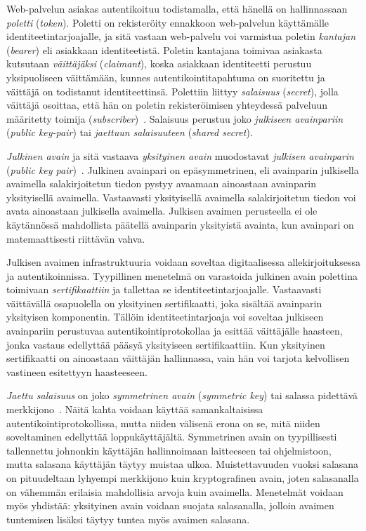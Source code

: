 \documentclass[finnish,gradu]{tktltiki}
\begin{document}
  Web-palvelun asiakas autentikoituu todistamalla, että hänellä on hallinnassaan \emph{poletti} (\emph{token}). Poletti on rekisteröity ennakkoon web-palvelun käyttämälle identiteetintarjoajalle, ja sitä vastaan web-palvelu voi varmistua poletin \emph{kantajan} (\emph{bearer}) eli asiakkaan identiteetistä. Poletin kantajana toimivaa asiakasta kutsutaan \emph{väittäjäksi} (\emph{claimant}), koska asiakkaan identiteetti perustuu yksipuoliseen väittämään, kunnes autentikointitapahtuma on suoritettu ja väittäjä on todistanut identiteettinsä. Polettiin liittyy \emph{salaisuus} (\emph{secret}), jolla väittäjä osoittaa, että hän on poletin rekisteröimisen yhteydessä palveluun määritetty toimija (\emph{subscriber})~\cite{NIST_SP800-63-1}. Salaisuus perustuu joko \emph{julkiseen avainpariin} (\emph{public key-pair}) tai \emph{jaettuun salaisuuteen} (\emph{shared secret}).

  \emph{Julkinen avain} ja sitä vastaava \emph{yksityinen avain} muodostavat \emph{julkisen avainparin} (\emph{public key pair})~\cite{NIST_SP800-63-1}. Julkinen avainpari on epäsymmetrinen, eli avainparin julkisella avaimella salakirjoitetun tiedon pystyy avaamaan ainoastaan avainparin yksityisellä avaimella. Vastaavasti yksityisellä avaimella salakirjoitetun tiedon voi avata ainoastaan julkisella avaimella. Julkisen avaimen perusteella ei ole käytännössä mahdollista päätellä avainparin yksityistä avainta, kun avainpari on matemaattisesti riittävän vahva.

  Julkisen avaimen infrastruktuuria voidaan soveltaa digitaalisessa allekirjoituksessa ja autentikoinnissa. Tyypillinen menetelmä on varastoida julkinen avain polettina toimivaan \emph{sertifikaattiin} ja tallettaa se identiteetintarjoajalle. Vastaavasti väittävällä osapuolella on yksityinen sertifikaatti, joka sisältää avainparin yksityisen komponentin. Tällöin identiteetintarjoaja voi soveltaa julkiseen avainpariin perustuvaa autentikointiprotokollaa ja esittää väittäjälle haasteen, jonka vastaus edellyttää pääsyä yksityiseen sertifikaattiin. Kun yksityinen sertifikaatti on ainoastaan väittäjän hallinnassa, vain hän voi tarjota kelvollisen vastineen esitettyyn haasteeseen.

  \emph{Jaettu salaisuus} on joko \emph{symmetrinen avain} (\emph{symmetric key}) tai salassa pidettävä merkkijono~\cite{NIST_SP800-63-1}. Näitä kahta voidaan käyttää samankaltaisissa autentikointiprotokollissa, mutta niiden välisenä erona on se, mitä niiden soveltaminen edellyttää loppukäyttäjältä. Symmetrinen avain on tyypillisesti tallennettu johnonkin käyttäjän hallinnoimaan laitteeseen tai ohjelmistoon, mutta salasana käyttäjän täytyy muistaa ulkoa. Muistettavuuden vuoksi salasana on pituudeltaan lyhyempi merkkijono kuin kryptografinen avain, joten salasanalla on vähemmän erilaisia mahdollisia arvoja kuin avaimella. Menetelmät voidaan myös yhdistää: yksityinen avain voidaan suojata salasanalla, jolloin avaimen tuntemisen lisäksi täytyy tuntea myös avaimen salasana.
\end{document}
